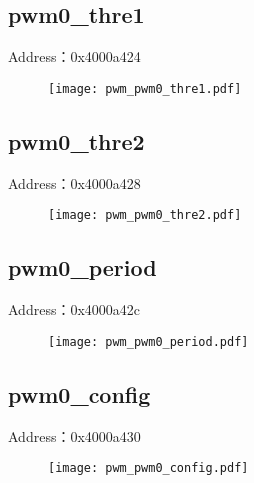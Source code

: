 \subsection{pwm0\_thre1}
\label{pwm-pwm0-thre1}
Address：0x4000a424
 \begin{figure}[H]
\texttt{[image: pwm\_pwm0\_thre1.pdf]}
\end{figure}

\subsection{pwm0\_thre2}
\label{pwm-pwm0-thre2}
Address：0x4000a428
 \begin{figure}[H]
\texttt{[image: pwm\_pwm0\_thre2.pdf]}
\end{figure}

\subsection{pwm0\_period}
\label{pwm-pwm0-period}
Address：0x4000a42c
 \begin{figure}[H]
\texttt{[image: pwm\_pwm0\_period.pdf]}
\end{figure}

\subsection{pwm0\_config}
\label{pwm-pwm0-config}
Address：0x4000a430
 \begin{figure}[H]
\texttt{[image: pwm\_pwm0\_config.pdf]}
\end{figure}

